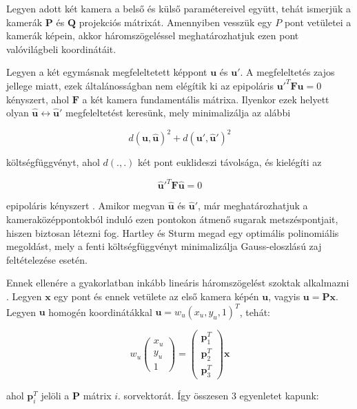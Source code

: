 Legyen adott két kamera a belső és külső paramétereivel együtt, tehát ismerjük a kamerák $\mathbf{P}$ és $\mathbf{Q}$ projekciós mátrixát. Amennyiben vesszük egy $P$ pont vetületei a kamerák képein, akkor háromszögeléssel meghatározhatjuk ezen pont valóvilágbeli koordinátáit.

Legyen a két egymásnak megfeleltetett képpont $\mathbf{u}$ és $\mathbf{u}'$. A megfeleltetés zajos jellege miatt, ezek általánosságban nem elégítik ki az epipoláris $\mathbf{u}'^T \mathbf{F} \mathbf{u} = 0$ kényszert, ahol $\mathbf{F}$ a két kamera fundamentális mátrixa. Ilyenkor ezek helyett olyan $\mathbf{\hat{u}} \leftrightarrow \mathbf{\hat{u}}'$ megfeleltetést keresünk, mely minimalizálja az alábbi

\[d(\mathbf{u}, \mathbf{\hat{u}})^2 + d(\mathbf{u}', \mathbf{\hat{u}}')^2\]

költségfüggvényt, ahol $d(., .)$ két pont euklideszi távolsága, és kielégíti az

\[\mathbf{\hat{u}}'^T \mathbf{F} \mathbf{\hat{u}} = 0\]

epipoláris kényszert \cite{hartley-triangulation}. Amikor megvan $\mathbf{\hat{u}}$ és $\mathbf{\hat{u}}'$, már meghatározhatjuk a kameraközéppontokból induló ezen pontokon átmenő sugarak metszéspontjait, hiszen biztosan létezni fog. Hartley és Sturm \cite{hartley-triangulation} megad egy optimális polinomiális megoldást, mely a fenti költségfüggvényt minimalizálja Gauss-eloszlású zaj feltételezése esetén.

Ennek ellenére a gyakorlatban inkább lineáris háromszögelést szoktak alkalmazni \cite[5.1 szekció]{hartley-triangulation}. Legyen $\mathbf{x}$ egy pont és ennek vetülete az első kamera képén $\mathbf{u}$, vagyis $\mathbf{u} = \mathbf{P}\mathbf{x}$. Legyen $\mathbf{u}$ homogén koordinátákkal $\mathbf{u} = w_u(x_u, y_u, 1)^T$, tehát:

\[w_u\left( \begin{array}{c} x_u \\ y_u \\ 1 \end{array} \right) = \left( \begin{array}{c} \mathbf{p}_1^T \\ \mathbf{p}_2^T \\ \mathbf{p}_3^T \end{array} \right) \mathbf{x}\]

ahol $\mathbf{p}_i^T$ jelöli a $\mathbf{P}$ mátrix $i$. sorvektorát. Így összesen 3 egyenletet kapunk:

